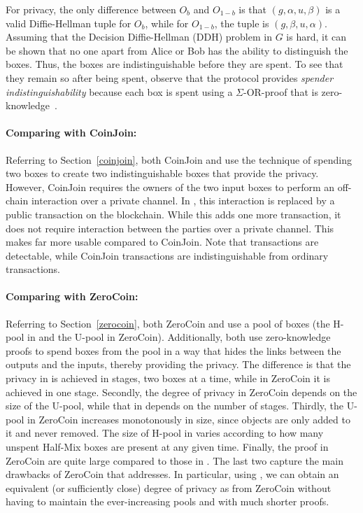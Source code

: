 \documentclass[runningheads]{llncs}
\begin{document}
For privacy, the only difference between $O_b$ and $O_{1-b}$ is that $(g, \alpha, u, \beta)$ is a valid Diffie-Hellman tuple for $O_b$, while for $O_{1-b}$, the tuple is $(g, \beta, u, \alpha)$. Assuming that the Decision Diffie-Hellman (DDH) problem in $G$ is hard, it can be shown that no one apart from Alice or Bob has the ability to distinguish the boxes.
Thus, the boxes are indistinguishable before they are spent. To see that they remain so after being spent, observe that the protocol provides {\em spender indistinguishability} because each box is spent using a $\Sigma$-OR-proof that is zero-knowledge~\cite{Dam10}. 

\paragraph{Comparing with CoinJoin:} Referring to Section~\ref{coinjoin}, both CoinJoin and \algname use the technique of spending two boxes to create two indistinguishable boxes that provide the privacy. However, CoinJoin requires the owners of the two input boxes to perform an off-chain interaction over a private channel. In \algname, this interaction is replaced by a public transaction on the blockchain. While this adds one more transaction, it does not require interaction between the parties over a private channel. This makes \algname far more usable compared to CoinJoin. Note that \algname transactions are detectable, while CoinJoin transactions are indistinguishable from ordinary transactions.

\paragraph{Comparing with ZeroCoin:} Referring to Section~\ref{zerocoin}, both ZeroCoin and \algname use a pool of boxes (the H-pool in \algname and the U-pool in ZeroCoin). Additionally, both use zero-knowledge proofs to spend boxes from the pool in a way that hides the links between the outputs and the inputs, thereby providing the privacy. 
The difference is that the privacy in \algname is achieved in stages, two boxes at a time, while in ZeroCoin it is achieved in one stage. Secondly, the degree of privacy in ZeroCoin depends on the size of the U-pool, while that in \algname depends on the number of stages. Thirdly, the U-pool in ZeroCoin increases monotonously in size, since objects are only added to it and never removed. The size of H-pool in \algname varies according to how many unspent Half-Mix boxes are present at any given time. Finally, the proof in ZeroCoin are quite large compared to those in \algname. The last two capture the main drawbacks of ZeroCoin that \algname addresses.
In particular, using \algname, we can obtain an equivalent (or sufficiently close) degree of privacy as from ZeroCoin without having to maintain the ever-increasing pools and with much shorter proofs. 
\end{document}
